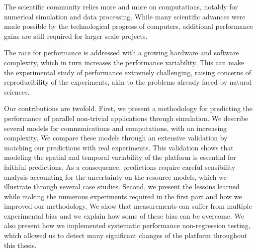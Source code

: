The scientific community relies more and more on computations, notably for numerical simulation and data processing.
While many scientific advances were made possible by the technological progress of computers, additional performance
gains are still required for larger scale projects.

The race for performance is addressed with a growing hardware and software complexity, which in turn increases the
performance variability. This can make the experimental study of performance extremely challenging, raising concerns of
reproducibility of the experiments, akin to the problems already faced by natural sciences.

Our contributions are twofold. First, we present a methodology for predicting the performance of parallel non-trivial
applications through simulation. We describe several models for communications and computations, with an increasing
complexity. We compare these models through an extensive validation by matching our predictions with real experiments.
This validation shows that modeling the spatial and temporal variability of the platform is essential for faithful
predictions. As a consequence, predictions require careful sensibility analysis accounting for the uncertainty on the
resource models, which we illustrate through several case studies.  Second, we present the lessons learned while making
the numerous experiments required in the first part and how we improved our methodology. We show that measurements can
suffer from multiple experimental bias and we explain how some of these bias can be overcome. We also present how we
implemented systematic performance non-regression testing, which allowed us to detect many significant changes of the
platform throughout this thesis.
